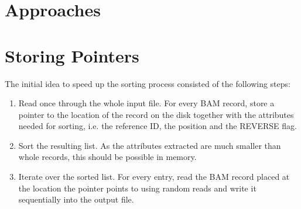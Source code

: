 \section{Approaches}
\section{Storing Pointers}
The initial idea to speed up the sorting process consisted of the following steps: 
\begin{enumerate}
    \item Read once through the whole input file. For every BAM record, store a pointer to the location of the record on the disk together with the attributes needed for sorting, i.e. the reference ID, the position and the REVERSE flag.
    \item Sort the resulting list. As the attributes extracted are much smaller than whole records, this should be possible in memory.
    \item Iterate over the sorted list. For every entry, read the BAM record placed at the location the pointer points to using random reads and write it sequentially into the output file.
\end{enumerate}

